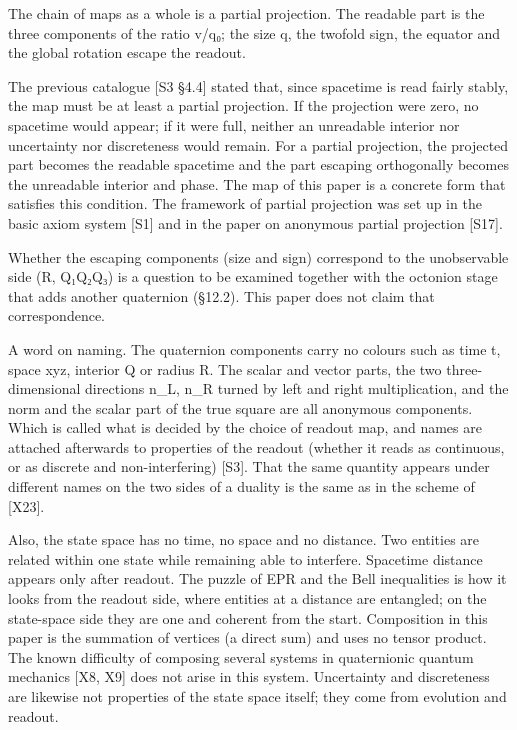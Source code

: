 \documentclass[
  a4paper,
]{article}
\begin{document}
The chain of maps as a whole is a partial projection. The readable part
is the three components of the ratio v/q₀; the size \textbar q\textbar,
the twofold sign, the equator and the global rotation escape the
readout.

The previous catalogue {[}S3 §4.4{]} stated that, since spacetime is
read fairly stably, the map must be at least a partial projection. If
the projection were zero, no spacetime would appear; if it were full,
neither an unreadable interior nor uncertainty nor discreteness would
remain. For a partial projection, the projected part becomes the
readable spacetime and the part escaping orthogonally becomes the
unreadable interior and phase. The map of this paper is a concrete form
that satisfies this condition. The framework of partial projection was
set up in the basic axiom system {[}S1{]} and in the paper on anonymous
partial projection {[}S17{]}.

Whether the escaping components (size and sign) correspond to the
unobservable side (R, Q₁Q₂Q₃) is a question to be examined together with
the octonion stage that adds another quaternion (§12.2). This paper does
not claim that correspondence.

A word on naming. The quaternion components carry no colours such as
time t, space xyz, interior Q or radius R. The scalar and vector parts,
the two three-dimensional directions n\_L, n\_R turned by left and right
multiplication, and the norm and the scalar part of the true square are
all anonymous components. Which is called what is decided by the choice
of readout map, and names are attached afterwards to properties of the
readout (whether it reads as continuous, or as discrete and
non-interfering) {[}S3{]}. That the same quantity appears under
different names on the two sides of a duality is the same as in the
scheme of {[}X23{]}.

Also, the state space has no time, no space and no distance. Two
entities are related within one state while remaining able to interfere.
Spacetime distance appears only after readout. The puzzle of EPR and the
Bell inequalities is how it looks from the readout side, where entities
at a distance are entangled; on the state-space side they are one and
coherent from the start. Composition in this paper is the summation of
vertices (a direct sum) and uses no tensor product. The known difficulty
of composing several systems in quaternionic quantum mechanics {[}X8,
X9{]} does not arise in this system. Uncertainty and discreteness are
likewise not properties of the state space itself; they come from
evolution and readout.
\end{document}
